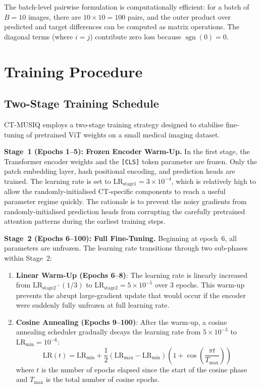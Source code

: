 The batch-level pairwise formulation is computationally efficient: for a batch of
$B = 10$ images, there are $10 \times 10 = 100$ pairs, and the outer product over
predicted and target differences can be computed as matrix operations. The diagonal
terms (where $i = j$) contribute zero loss because $\operatorname{sgn}(0) = 0$.


\section{Training Procedure}
\label{sec:training}

\subsection{Two-Stage Training Schedule}

CT-MUSIQ employs a two-stage training strategy designed to stabilise fine-tuning of
pretrained ViT weights on a small medical imaging dataset.

\textbf{Stage~1 (Epochs 1--5): Frozen Encoder Warm-Up.}
In the first stage, the Transformer encoder weights and the \texttt{[CLS]} token
parameter are frozen. Only the patch embedding layer, hash positional encoding, and
prediction heads are trained. The learning rate is set to
$\text{LR}_{\text{stage1}} = 3 \times 10^{-4}$, which is relatively high to allow the
randomly-initialised CT-specific components to reach a useful parameter regime quickly.
The rationale is to prevent the noisy gradients from randomly-initialised prediction
heads from corrupting the carefully pretrained attention patterns during the earliest
training steps.

\textbf{Stage~2 (Epochs 6--100): Full Fine-Tuning.}
Beginning at epoch~6, all parameters are unfrozen. The learning rate transitions through
two sub-phases within Stage~2:

\begin{enumerate}
    \item \textbf{Linear Warm-Up (Epochs 6--8)}: The learning rate is linearly increased
          from $\text{LR}_{\text{stage2}} \cdot (1/3)$ to
          $\text{LR}_{\text{stage2}} = 5 \times 10^{-5}$ over 3 epochs. This warm-up
          prevents the abrupt large-gradient update that would occur if the encoder
          were suddenly fully unfrozen at full learning rate.
    \item \textbf{Cosine Annealing (Epochs 9--100)}: After the warm-up, a cosine
          annealing scheduler gradually decays the learning rate from
          $5 \times 10^{-5}$ to $\text{LR}_{\min} = 10^{-6}$:
          \begin{equation}
              \text{LR}(t) = \text{LR}_{\min} + \frac{1}{2}
              (\text{LR}_{\max} - \text{LR}_{\min})
              \left(1 + \cos\!\left(\frac{\pi t}{T_{\max}}\right)\right)
              \label{eq:cosine_lr}
          \end{equation}
          where $t$ is the number of epochs elapsed since the start of the cosine phase
          and $T_{\max}$ is the total number of cosine epochs.
\end{enumerate}

